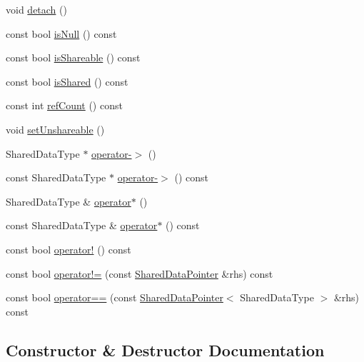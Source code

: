 \begin{DoxyCompactItemize}
void \hyperlink{classprism_1_1memory_1_1_shared_data_pointer_ae678a22d7837d6e157a482684ccd768e}{detach} ()
\item 
const bool \hyperlink{classprism_1_1memory_1_1_shared_data_pointer_aa150c9177ff76a8177924f21510058e6}{is\+Null} () const 
\item 
const bool \hyperlink{classprism_1_1memory_1_1_shared_data_pointer_a0104cb618a402a38728f7292308fff76}{is\+Shareable} () const 
\item 
const bool \hyperlink{classprism_1_1memory_1_1_shared_data_pointer_a236a58e95a8bba5538947d1e739456a3}{is\+Shared} () const 
\item 
const int \hyperlink{classprism_1_1memory_1_1_shared_data_pointer_a66e6434630987a02ca1d697948b929b1}{ref\+Count} () const 
\item 
void \hyperlink{classprism_1_1memory_1_1_shared_data_pointer_a59b2451c98fcff84520d47fa3f537960}{set\+Unshareable} ()
\item 
Shared\+Data\+Type $\ast$ \hyperlink{classprism_1_1memory_1_1_shared_data_pointer_a4c4f94391d8dc2bba3eb8ac57120645c}{operator-\/$>$} ()
\item 
const Shared\+Data\+Type $\ast$ \hyperlink{classprism_1_1memory_1_1_shared_data_pointer_a926ef0ea9279bdaf8d7064b30f8ba998}{operator-\/$>$} () const 
\item 
Shared\+Data\+Type \& \hyperlink{classprism_1_1memory_1_1_shared_data_pointer_acd5200018cf4264c8ecbab16af41399a}{operator$\ast$} ()
\item 
const Shared\+Data\+Type \& \hyperlink{classprism_1_1memory_1_1_shared_data_pointer_a9900da85919847f3139221fea27783d7}{operator$\ast$} () const 
\item 
const bool \hyperlink{classprism_1_1memory_1_1_shared_data_pointer_a8f3230148b77d4529a243d44b62e27b1}{operator!} () const 
\item 
const bool \hyperlink{classprism_1_1memory_1_1_shared_data_pointer_a671a8143dd36a55bd64f989c85310902}{operator!=} (const \hyperlink{classprism_1_1memory_1_1_shared_data_pointer}{Shared\+Data\+Pointer} \&rhs) const 
\item 
const bool \hyperlink{classprism_1_1memory_1_1_shared_data_pointer_ab074ff7fe192e814f1efd521a3d6b67d}{operator==} (const \hyperlink{classprism_1_1memory_1_1_shared_data_pointer}{Shared\+Data\+Pointer}$<$ Shared\+Data\+Type $>$ \&rhs) const 
\end{DoxyCompactItemize}


\subsection{Constructor \& Destructor Documentation}
